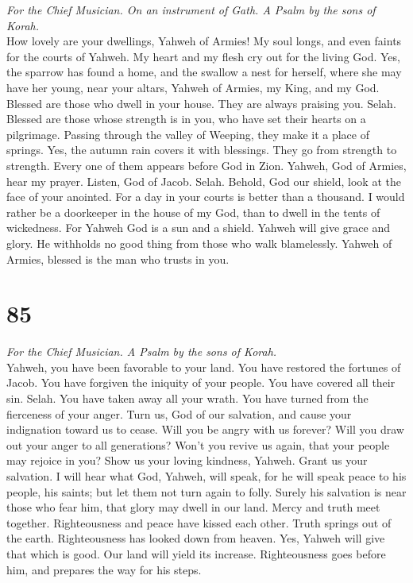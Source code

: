 \emph{For the Chief Musician. On an instrument of Gath. A Psalm by the
sons of Korah.}\\
 How lovely are your dwellings, Yahweh of Armies!
 My soul longs, and even faints for the courts of Yahweh.
My heart and my flesh cry out for the living God.  Yes,
the sparrow has found a home, and the swallow a nest for herself, where
she may have her young, near your altars, Yahweh of Armies, my King, and
my God.  Blessed are those who dwell in your house. They
are always praising you. Selah.  Blessed are those whose
strength is in you, who have set their hearts on a pilgrimage.
 Passing through the valley of Weeping, they make it a
place of springs. Yes, the autumn rain covers it with blessings.
 They go from strength to strength. Every one of them
appears before God in Zion.  Yahweh, God of Armies, hear
my prayer. Listen, God of Jacob. Selah.  Behold, God our
shield, look at the face of your anointed.  For a day in
your courts is better than a thousand. I would rather be a doorkeeper in
the house of my God, than to dwell in the tents of wickedness.
 For Yahweh God is a sun and a shield. Yahweh will give
grace and glory. He withholds no good thing from those who walk
blamelessly.  Yahweh of Armies, blessed is the man who
trusts in you.

\hypertarget{section-84}{%
\section{85}\label{section-84}}

\emph{For the Chief Musician. A Psalm by the sons of Korah.}\\
 Yahweh, you have been favorable to your land. You have
restored the fortunes of Jacob.  You have forgiven the
iniquity of your people. You have covered all their sin. Selah.
 You have taken away all your wrath. You have turned from
the fierceness of your anger.  Turn us, God of our
salvation, and cause your indignation toward us to cease. 
Will you be angry with us forever? Will you draw out your anger to all
generations?  Won't you revive us again, that your people
may rejoice in you?  Show us your loving kindness, Yahweh.
Grant us your salvation.  I will hear what God, Yahweh,
will speak, for he will speak peace to his people, his saints; but let
them not turn again to folly.  Surely his salvation is
near those who fear him, that glory may dwell in our land.
 Mercy and truth meet together. Righteousness and peace
have kissed each other.  Truth springs out of the earth.
Righteousness has looked down from heaven.  Yes, Yahweh
will give that which is good. Our land will yield its increase.
 Righteousness goes before him, and prepares the way for
his steps.

